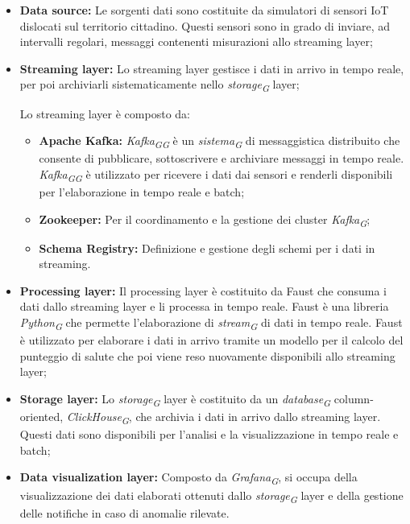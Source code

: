 \begin{itemize}
    \item \textbf{Data source:} Le sorgenti dati sono costituite da simulatori di sensori IoT dislocati sul territorio cittadino. Questi sensori sono in grado di inviare, ad intervalli regolari, messaggi contenenti misurazioni allo streaming layer;
    
    \item \textbf{Streaming layer:} Lo streaming layer gestisce i dati in arrivo in tempo reale, per poi archiviarli sistematicamente nello \textit{storage}\textsubscript{\textit{G}} layer;
    
    Lo streaming layer è composto da:
    \begin{itemize}
        \item \textbf{Apache Kafka:} \textit{Kafka}\textsubscript{\textit{G}}\textsubscript{\textit{G}} è un \textit{sistema}\textsubscript{\textit{G}} di messaggistica distribuito che consente di pubblicare, sottoscrivere e archiviare messaggi in tempo reale. \textit{Kafka}\textsubscript{\textit{G}}\textsubscript{\textit{G}} è utilizzato per ricevere i dati dai sensori e renderli disponibili per l'elaborazione in tempo reale e batch;
        
        \item \textbf{Zookeeper:} Per il coordinamento e la gestione dei cluster \textit{Kafka}\textsubscript{\textit{G}};
        \item \textbf{Schema Registry:} Definizione e gestione degli schemi per i dati in streaming.
    \end{itemize}

    \item \textbf{Processing layer:} Il processing layer è costituito da Faust che consuma i dati dallo streaming layer e li processa in tempo reale. Faust è una libreria \textit{Python}\textsubscript{\textit{G}} che permette l'elaborazione di \textit{stream}\textsubscript{\textit{G}} di dati in tempo reale. Faust è utilizzato per elaborare i dati in arrivo tramite un modello per il calcolo del punteggio di salute che poi viene reso nuovamente disponibili allo streaming layer;
    
    \item \textbf{Storage layer:} Lo \textit{storage}\textsubscript{\textit{G}} layer è costituito da un \textit{database}\textsubscript{\textit{G}} column-oriented, \textit{ClickHouse}\textsubscript{\textit{G}}, che archivia i dati in arrivo dallo streaming layer. Questi dati sono disponibili per l'analisi e la visualizzazione in tempo reale e batch;
    
    \item \textbf{Data visualization layer:} Composto da \textit{Grafana}\textsubscript{\textit{G}}, si occupa della visualizzazione dei dati elaborati ottenuti dallo \textit{storage}\textsubscript{\textit{G}} layer e della gestione delle notifiche in caso di anomalie rilevate.
\end{itemize}